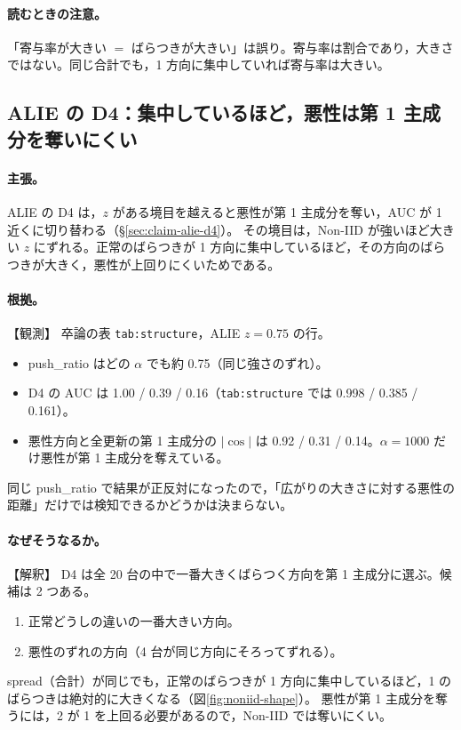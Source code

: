 \documentclass[a4j, dvipdfmx]{jsarticle}  %
\begin{document}
\paragraph{読むときの注意。}
「寄与率が大きい $=$ ばらつきが大きい」は誤り。寄与率は割合であり，大きさではない。同じ合計でも，1 方向に集中していれば寄与率は大きい。

\subsection{ALIE の D4：集中しているほど，悪性は第 1 主成分を奪いにくい}
\label{sec:claim-noniid-d4}

\paragraph{主張。}
ALIE の D4 は，$z$ がある境目を越えると悪性が第 1 主成分を奪い，AUC が 1 近くに切り替わる（\S\ref{sec:claim-alie-d4}）。
その境目は，Non-IID が強いほど大きい $z$ にずれる。正常のばらつきが 1 方向に集中しているほど，その方向のばらつきが大きく，悪性が上回りにくいためである。

\paragraph{根拠。}【観測】
卒論の表 \texttt{tab:structure}，ALIE $z = 0.75$ の行。
\begin{itemize}
  \item push\_ratio はどの $\alpha$ でも約 0.75（同じ強さのずれ）。
  \item D4 の AUC は 1.00 / 0.39 / 0.16（\texttt{tab:structure} では 0.998 / 0.385 / 0.161）。
  \item 悪性方向と全更新の第 1 主成分の $|\cos|$ は 0.92 / 0.31 / 0.14。$\alpha = 1000$ だけ悪性が第 1 主成分を奪えている。
\end{itemize}
同じ push\_ratio で結果が正反対になったので，「広がりの大きさに対する悪性の距離」だけでは検知できるかどうかは決まらない。

\paragraph{なぜそうなるか。}【解釈】
D4 は全 20 台の中で一番大きくばらつく方向を第 1 主成分に選ぶ。候補は 2 つある。
\begin{enumerate}
  \item 正常どうしの違いの一番大きい方向。
  \item 悪性のずれの方向（4 台が同じ方向にそろってずれる）。
\end{enumerate}
spread（合計）が同じでも，正常のばらつきが 1 方向に集中しているほど，1 のばらつきは絶対的に大きくなる（図\ref{fig:noniid-shape}）。
悪性が第 1 主成分を奪うには，2 が 1 を上回る必要があるので，Non-IID では奪いにくい。
\end{document}
